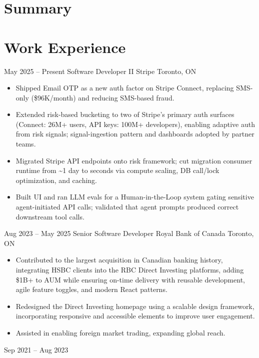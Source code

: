 \documentclass[letterpaper]{moderncv}
\begin{document}
\makecvtitle

\section{Summary}

\section{Work Experience}
\cventry
{May 2025 -- Present}
{Software Developer II}
{Stripe}
{Toronto, ON}
{}
{\begin{itemize}%
	\item Shipped Email OTP as a new auth factor on Stripe Connect, replacing SMS-only (\$96K/month) and reducing SMS-based fraud.
	\item Extended risk-based bucketing to two of Stripe's primary auth surfaces (Connect: 26M+ users, API keys: 100M+ developers), enabling adaptive auth from risk signals; signal-ingestion pattern and dashboards adopted by partner teams.
	\item Migrated Stripe API endpoints onto risk framework; cut migration consumer runtime from \textasciitilde1 day to seconds via compute scaling, DB call/lock optimization, and caching.
	\item Built UI and ran LLM evals for a Human-in-the-Loop system gating sensitive agent-initiated API calls; validated that agent prompts produced correct downstream tool calls.
	\end{itemize}}
\cventry
{Aug 2023 -- May 2025}
{Senior Software Developer}
{Royal Bank of Canada}
{Toronto, ON}
{}
{\begin{itemize}%
	\item Contributed to the largest acquisition in Canadian banking history, integrating HSBC clients into the RBC Direct Investing platforms, adding \$1B+ to AUM while ensuring on-time delivery with reusable development, agile feature toggles, and modern React patterns.
	\item Redesigned the Direct Investing homepage using a scalable design framework, incorporating responsive and accessible elements to improve user engagement.
	\item Assisted in enabling foreign market trading, expanding global reach.
	\end{itemize}}
\cventry
{Sep 2021 -- Aug 2023}
\end{document}
